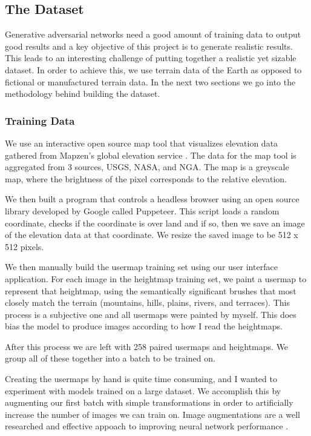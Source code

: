 \documentclass[twocolumn]{article}
\begin{document}
	\subsection{The Dataset}
	
	Generative adversarial networks need a good amount of training data to output good results and a key objective of this project is to generate realistic results. This leads to an interesting challenge of putting together a realistic yet sizable dataset. In order to achieve this, we use terrain data of the Earth as opposed to fictional or manufactured terrain data. In the next two sections we go into the methodology behind building the dataset.

	\subsubsection{Training Data}
	
	We use an interactive open source map tool that visualizes elevation data gathered from Mapzen's global elevation service \cite{richardson2016mapzen}. The data for the map tool is aggregated from 3 sources, USGS, NASA, and NGA. The map is a greyscale map, where the brightness of the pixel corresponds to the relative elevation.
	
	We then built a program that controls a headless browser using an open source library developed by Google called Puppeteer. This script loads a random coordinate, checks if the coordinate is over land and if so, then we save an image of the elevation data at that coordinate. We resize the saved image to be 512 x 512 pixels.
	
	We then manually build the usermap training set using our user interface application. For each image in the heightmap training set, we paint a usermap to represent that heightmap, using the semantically significant brushes that most closely match the terrain (mountains, hills, plains, rivers, and terraces). This process is a subjective one and all usermaps were painted by myself. This does bias the model to produce images according to how I read the heightmaps.

	After this process we are left with 258 paired usermaps and heightmaps. We group all of these together into a batch to be trained on.

	Creating the usermaps by hand is quite time consuming, and I wanted to experiment with models trained on a large dataset. We accomplish this by augmenting our first batch with simple transformations in order to artificially increase the number of images we can train on. Image augmentations are a well researched and effective appoach to improving neural network performance \cite{perez2017effectiveness}.
	
\end{document}

